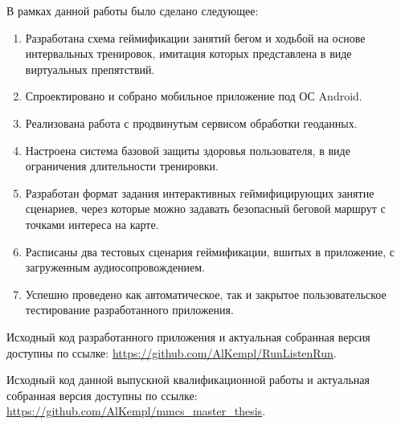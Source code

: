 \Conc
В рамках данной работы было сделано следующее:
\begin{enumerate}
	\item Разработана схема геймификации занятий бегом и ходьбой на основе интервальных тренировок, имитация которых представлена в виде виртуальных препятствий.
	\item Спроектировано и собрано мобильное приложение под ОС Android.
	\item Реализована работа с продвинутым сервисом обработки геоданных.
	\item Настроена система базовой защиты здоровья пользователя, в виде ограничения длительности тренировки.
	\item Разработан формат задания интерактивных геймифицирующих занятие сценариев, через которые можно задавать безопасный беговой маршрут с точками интереса на карте.
	\item Расписаны два тестовых сценария геймификации, вшитых в приложение, с загруженным аудиосопровождением.
	\item Успешно проведено как автоматическое, так и закрытое пользовательское тестирование разработанного приложения.
\end{enumerate} 
\smallskip

Исходный код разработанного приложения и актуальная собранная версия доступны по ссылке: \url{https://github.com/AlKempl/RunListenRun}.


Исходный код данной выпускной квалификационной работы и актуальная собранная версия доступны по ссылке: \url{https://github.com/AlKempl/mmcs_master_thesis}.


